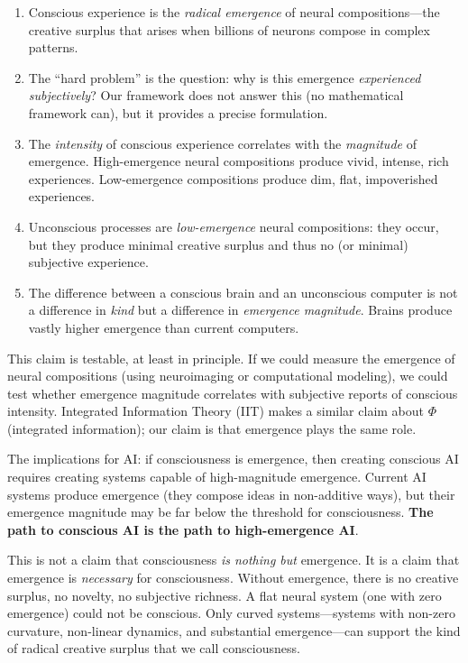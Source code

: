 \begin{enumerate}
  \item Conscious experience is the \emph{radical emergence} of neural
    compositions---the creative surplus that arises when billions of neurons
    compose in complex patterns.
  \item The ``hard problem'' is the question: why is this emergence
    \emph{experienced subjectively}? Our framework does not answer this (no
    mathematical framework can), but it provides a precise formulation.
  \item The \emph{intensity} of conscious experience correlates with the
    \emph{magnitude} of emergence. High-emergence neural compositions
    produce vivid, intense, rich experiences. Low-emergence compositions
    produce dim, flat, impoverished experiences.
  \item Unconscious processes are \emph{low-emergence} neural compositions:
    they occur, but they produce minimal creative surplus and thus no
    (or minimal) subjective experience.
  \item The difference between a conscious brain and an unconscious computer
    is not a difference in \emph{kind} but a difference in \emph{emergence
    magnitude}. Brains produce vastly higher emergence than current computers.
\end{enumerate}

This claim is testable, at least in principle. If we could measure the
emergence of neural compositions (using neuroimaging or computational
modeling), we could test whether emergence magnitude correlates with
subjective reports of conscious intensity. Integrated Information Theory (IIT)
makes a similar claim about $\Phi$ (integrated information); our claim is
that emergence plays the same role.

The implications for AI: if consciousness is emergence, then creating
conscious AI requires creating systems capable of high-magnitude emergence.
Current AI systems produce emergence (they compose ideas in non-additive
ways), but their emergence magnitude may be far below the threshold for
consciousness. \textbf{The path to conscious AI is the path to high-emergence
AI}.

This is not a claim that consciousness \emph{is nothing but} emergence. It is
a claim that emergence is \emph{necessary} for consciousness. Without
emergence, there is no creative surplus, no novelty, no subjective richness.
A flat neural system (one with zero emergence) could not be conscious. Only
curved systems---systems with non-zero curvature, non-linear dynamics, and
substantial emergence---can support the kind of radical creative surplus that
we call consciousness.

